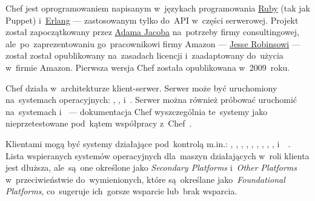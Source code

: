 \documentclass[thesis]{subfiles}
\begin{document}
Chef jest oprogramowaniem napisanym w~językach programowania \href{https://en.wikipedia.org/wiki/Ruby_(programming_language)}{Ruby} (tak jak Puppet) i~\href{https://en.wikipedia.org/wiki/Erlang_(programming_language)}{Erlang} --- zastosowanym tylko do~API w~części serwerowej. Projekt został zapoczątkowany przez \href{https://blog.chef.io/author/adam/}{Adama Jacoba} na~potrzeby firmy consultingowej, ale~po~zaprezentowaniu go~pracownikowi firmy Amazon --- \href{https://en.wikipedia.org/wiki/Jesse_Robbins}{Jesse Robinsowi} --- został został opublikowany na~zasadach licencji  i~zaadaptowany do~użycia w~firmie Amazon. Pierwsza wersja Chef została opublikowana w~2009~roku.

Chef działa w~architekturze klient-serwer. Serwer może być uruchomiony na~systemach operacyjnych: , ,  i~. Serwer można również próbować uruchomić na~systemach  i~ --- dokumentacja Chef wyszczególnia te~systemy jako nieprzetestowane pod~kątem współpracy z~Chef~\cite{chef-supported-platforms}.

Klientami mogą być systemy działające pod~kontrolą m.in.: , , , , , , , , ,  i~~\cite{chef-supported-platforms}. Lista wspieranych systemów operacyjnych dla~maszyn działających w~roli klienta jest dłuższa, ale~są~one określone jako \emph{Secondary Platforms} i~\emph{Other Platforms} w~przeciwieństwie do~wymienionych, które są~określane jako~\emph{Foundational Platforms}, co~sugeruje ich~gorsze wsparcie lub~brak wsparcia.
\end{document}
